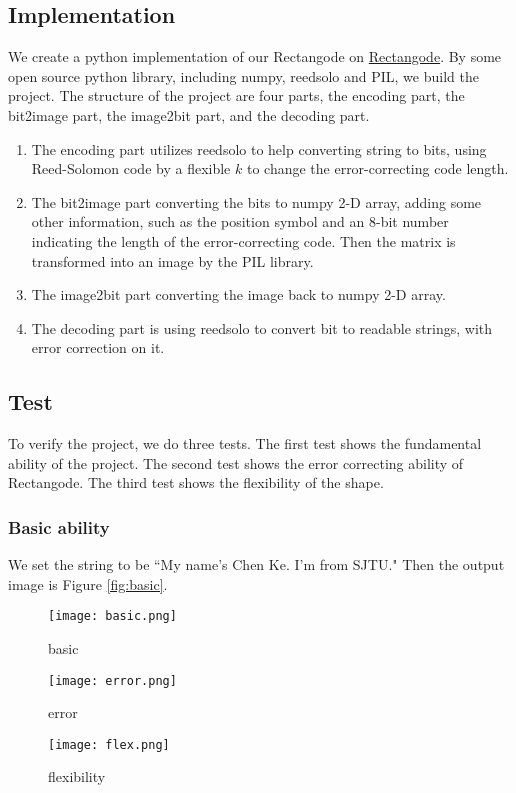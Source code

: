 \documentclass[12pt]{article}
\begin{document}
\subsection{Implementation}
We create a python implementation of our Rectangode on \href{https://github.com/Gazer2020/Rectangode/}{Rectangode}. By some open source python library, including numpy, reedsolo and PIL, we build the project. The structure of the project are four parts, the encoding part, the bit2image part, the image2bit part, and the decoding part.
\begin{enumerate}
    \item The encoding part utilizes reedsolo to help converting string to bits, using Reed-Solomon code by a flexible $k$ to change the error-correcting code length.
    \item The bit2image part converting the bits to numpy 2-D array, adding some other information, such as the position symbol and an 8-bit number indicating the length of the error-correcting code. Then the matrix is transformed into an image by the PIL library.
    \item The image2bit part converting the image back to numpy 2-D array.
    \item The decoding part is using reedsolo to convert bit to readable strings, with error correction on it.
\end{enumerate}

\subsection{Test}
To verify the project, we do three tests. The first test shows the fundamental ability of the project. The second test shows the error correcting ability of Rectangode. The third test shows the flexibility of the shape.

\subsubsection{Basic ability}
We set the string to be ``My name's Chen Ke. I'm from SJTU." Then the output image is Figure \ref{fig:basic}.

\begin{figure}[htbp]
\centering
\begin{minipage}[t]{0.3\textwidth}
\centering
\texttt{[image: basic.png]}
\caption{basic}
\label{fig:basic}
\end{minipage}
\begin{minipage}[t]{0.3\textwidth}
\centering
\texttt{[image: error.png]}
\caption{error}
\label{fig:error}
\end{minipage}
\begin{minipage}[t]{0.3\textwidth}
\centering
\texttt{[image: flex.png]}
\caption{flexibility}
\label{fig:flex}
\end{minipage}
\end{figure}
\end{document}
